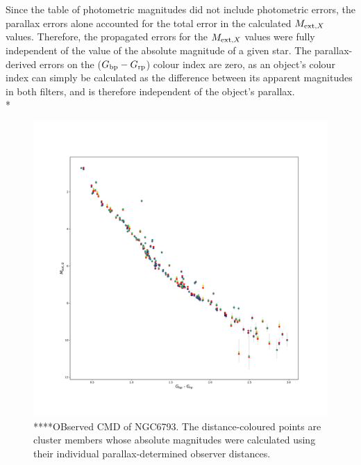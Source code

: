 \documentclass[12pt, a4paper]{report}
\begin{document}
Since the table of photometric magnitudes did not include photometric errors, the parallax errors alone accounted for the total error in the calculated $M_{\textnormal{ext},X}$ values. Therefore, the propagated errors for the $M_{\textnormal{ext},X}$ values were fully independent of the value of the absolute magnitude of a given star. The parallax-derived errors on the ($G_{\textnormal{bp}}-G_{\textnormal{rp}}$) colour index are zero, as an object's colour index can simply be calculated as the difference between its apparent magnitudes in both filters, and is therefore independent of the object's parallax.\\*

\begin{figure}[h!]
\begin{center}
\includegraphics[width=1.0\textwidth]{../NGC_6793_CMD_FeH_0p062_Av_500Myr_single_distance.pdf}
\caption{****OBserved CMD of NGC6793. The distance-coloured points are cluster members whose absolute magnitudes were calculated using their individual parallax-determined observer distances. }
\label{indiv_vs_single_distance_check}
\end{center}
\end{figure}
\end{document}
